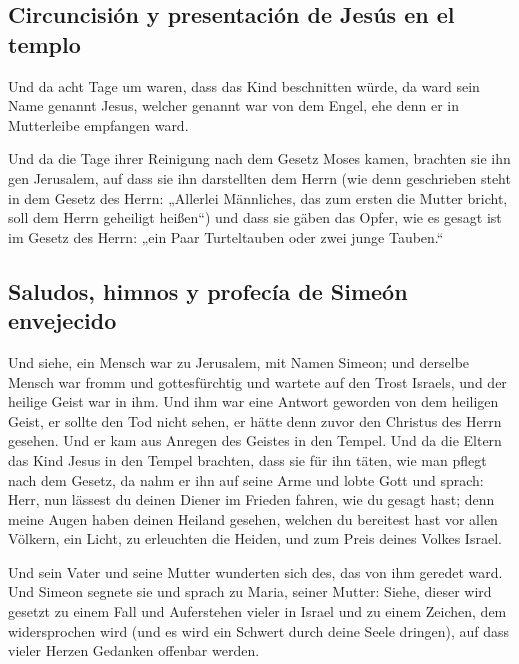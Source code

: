 \hypertarget{circuncisiuxf3n-y-presentaciuxf3n-de-jesuxfas-en-el-templo}{%
\subsection{Circuncisión y presentación de Jesús en el
templo}\label{circuncisiuxf3n-y-presentaciuxf3n-de-jesuxfas-en-el-templo}}

 Und da acht Tage um waren, dass das Kind beschnitten
würde, da ward sein Name genannt Jesus, welcher genannt war von dem
Engel, ehe denn er in Mutterleibe empfangen ward.

 Und da die Tage ihrer Reinigung nach dem Gesetz Moses
kamen, brachten sie ihn gen Jerusalem, auf dass sie ihn darstellten dem
Herrn  (wie denn geschrieben steht in dem Gesetz des
Herrn: „Allerlei Männliches, das zum ersten die Mutter bricht, soll dem
Herrn geheiligt heißen``)  und dass sie gäben das Opfer,
wie es gesagt ist im Gesetz des Herrn: „ein Paar Turteltauben oder zwei
junge Tauben.``

\hypertarget{saludos-himnos-y-profecuxeda-de-simeuxf3n-envejecido}{%
\subsection{Saludos, himnos y profecía de Simeón
envejecido}\label{saludos-himnos-y-profecuxeda-de-simeuxf3n-envejecido}}

 Und siehe, ein Mensch war zu Jerusalem, mit Namen
Simeon; und derselbe Mensch war fromm und gottesfürchtig und wartete auf
den Trost Israels, und der heilige Geist war in ihm.  Und
ihm war eine Antwort geworden von dem heiligen Geist, er sollte den Tod
nicht sehen, er hätte denn zuvor den Christus des Herrn gesehen.
 Und er kam aus Anregen des Geistes in den Tempel. Und da
die Eltern das Kind Jesus in den Tempel brachten, dass sie für ihn
täten, wie man pflegt nach dem Gesetz,  da nahm er ihn
auf seine Arme und lobte Gott und sprach:  Herr, nun
lässest du deinen Diener im Frieden fahren, wie du gesagt hast;
 denn meine Augen haben deinen Heiland gesehen,
 welchen du bereitest hast vor allen Völkern,
 ein Licht, zu erleuchten die Heiden, und zum Preis
deines Volkes Israel.

 Und sein Vater und seine Mutter wunderten sich des, das
von ihm geredet ward.  Und Simeon segnete sie und sprach
zu Maria, seiner Mutter: Siehe, dieser wird gesetzt zu einem Fall und
Auferstehen vieler in Israel und zu einem Zeichen, dem widersprochen
wird  (und es wird ein Schwert durch deine Seele
dringen), auf dass vieler Herzen Gedanken offenbar werden.

